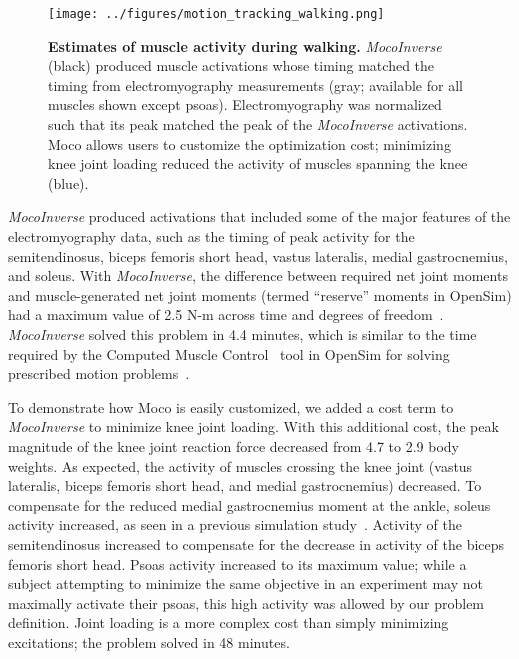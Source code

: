 \documentclass[10pt,letterpaper]{article}
\begin{document}
\begin{figure}[!h]
        \begin{adjustwidth}{-2.25in}{0in} %
    \centering
    \texttt{[image: ../figures/motion\_tracking\_walking.png]}
    \caption{{\bf Estimates of muscle activity during walking.}
    \textit{MocoInverse} (black) produced muscle activations whose timing matched the timing from electromyography measurements (gray; available for all muscles shown except psoas). Electromyography was normalized such that its peak matched the peak of the \textit{MocoInverse} activations. Moco allows users to customize the optimization cost; minimizing knee joint loading reduced the activity of muscles spanning the knee (blue).
    }
    \label{walking}
        \end{adjustwidth}
\end{figure}

\textit{MocoInverse} produced activations that included some of the major features of the electromyography data, such as the timing of peak activity for the semitendinosus, biceps femoris short head, vastus lateralis, medial gastrocnemius, and soleus. With \textit{MocoInverse}, the difference between required net joint moments and muscle-generated net joint moments (termed “reserve” moments in OpenSim) had a maximum value of 2.5 N-m across time and degrees of freedom~\cite{Hicks:2015bo}. \textit{MocoInverse} solved this problem in 4.4 minutes, which is similar to the time required by the Computed Muscle Control~\cite{Thelen:2003bba} tool in OpenSim for solving prescribed motion problems~\cite{Rajagopal:2016ek}.

To demonstrate how Moco is easily customized, we added a cost term to \textit{MocoInverse} to minimize knee joint loading. With this additional cost, the peak magnitude of the knee joint reaction force decreased from 4.7 to 2.9 body weights. As expected, the activity of muscles crossing the knee joint (vastus lateralis, biceps femoris short head, and medial gastrocnemius) decreased. To compensate for the reduced medial gastrocnemius moment at the ankle, soleus activity increased, as seen in a previous simulation study~\cite{DeMers:2014}. Activity of the semitendinosus increased to compensate for the decrease in activity of the biceps femoris short head. Psoas activity increased to its maximum value; while a subject attempting to minimize the same objective in an experiment may not maximally activate their psoas, this high activity was allowed by our problem definition. Joint loading is a more complex cost than simply minimizing excitations; the problem solved in 48 minutes.
\end{document}
